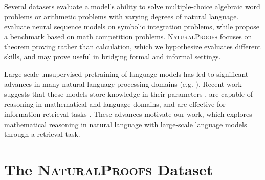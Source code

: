 Several datasets evaluate a model's ability to solve multiple-choice algebraic word problems \citep{roy2015solving,ling2017program,amini2019mathqa} or arithmetic problems \citep{saxton2018analysing} with varying degrees of natural language. 
\citet{lample2020deep} evaluate neural sequence models on symbolic integration problems, while \citet{hendrycks2021measuring} propose a benchmark based on math competition problems.
\textsc{NaturalProofs} focuses on theorem proving rather than calculation, which we hypothesize evaluates different skills, and may prove useful in bridging formal and informal settings.

Large-scale unsupervised pretraining of language models has led to significant advances in many natural language processing domains (e.g. \cite{devlin2019bert,radford2019language,raffel2020t5,brown2020gpt3}).
Recent work suggests that these models store knowledge in their parameters \citep{petroni2020language}, are capable of reasoning in mathematical \citep{rabe2021mathematical,wu2021lime} and language \citep{clark2020transformers,tafjord2020proofwriter} domains, and are effective for information retrieval tasks \citep{nogueira2020passage,nogueira2020beyond}.
These advances motivate our work, which explores mathematical reasoning in natural language with large-scale language models through a retrieval task.

\section{The \textsc{NaturalProofs} Dataset}
\label{sec:dataset}

